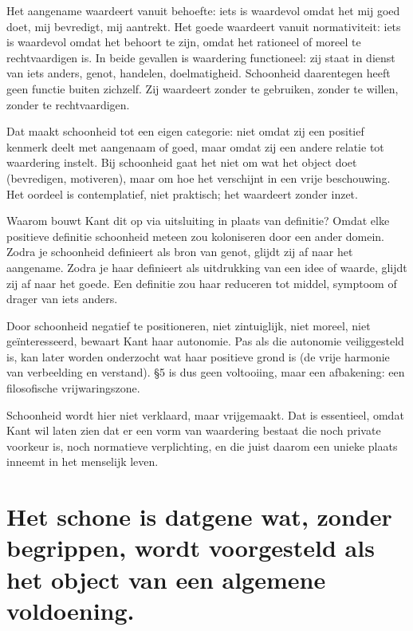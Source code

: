 \begin{mdframed}[leftmargin=0pt,rightmargin=0pt,backgroundcolor=blue!6,linecolor=white,innertopmargin=6pt,innerbottommargin=6pt]
Het aangename waardeert vanuit behoefte: iets is waardevol omdat het mij goed doet, mij bevredigt, mij aantrekt. Het goede waardeert vanuit normativiteit: iets is waardevol omdat het behoort te zijn, omdat het rationeel of moreel te rechtvaardigen is. In beide gevallen is waardering functioneel: zij staat in dienst van iets anders, genot, handelen, doelmatigheid. Schoonheid daarentegen heeft geen functie buiten zichzelf. Zij waardeert zonder te gebruiken, zonder te willen, zonder te rechtvaardigen.

Dat maakt schoonheid tot een eigen categorie: niet omdat zij een positief kenmerk deelt met aangenaam of goed, maar omdat zij een andere relatie tot waardering instelt. Bij schoonheid gaat het niet om wat het object doet (bevredigen, motiveren), maar om hoe het verschijnt in een vrije beschouwing. Het oordeel is contemplatief, niet praktisch; het waardeert zonder inzet.

Waarom bouwt Kant dit op via uitsluiting in plaats van definitie? Omdat elke positieve definitie schoonheid meteen zou koloniseren door een ander domein. Zodra je schoonheid definieert als bron van genot, glijdt zij af naar het aangename. Zodra je haar definieert als uitdrukking van een idee of waarde, glijdt zij af naar het goede. Een definitie zou haar reduceren tot middel, symptoom of drager van iets anders.

Door schoonheid negatief te positioneren, niet zintuiglijk, niet moreel, niet geïnteresseerd, bewaart Kant haar autonomie. Pas als die autonomie veiliggesteld is, kan later worden onderzocht wat haar positieve grond is (de vrije harmonie van verbeelding en verstand). §5 is dus geen voltooiing, maar een afbakening: een filosofische vrijwaringszone.

Schoonheid wordt hier niet verklaard, maar vrijgemaakt. Dat is essentieel, omdat Kant wil laten zien dat er een vorm van waardering bestaat die noch private voorkeur is, noch normatieve verplichting, en die juist daarom een unieke plaats inneemt in het menselijk leven.
\end{mdframed}


\section{Het schone is datgene wat, zonder begrippen, wordt voorgesteld als het object van een algemene voldoening.}

